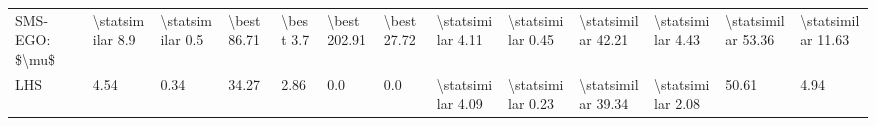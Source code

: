 \begin{tabular}{lllllllllllll}
SMS-EGO: \$\textbackslash mu\$ &   \textbackslash statsimilar 8.9 &   \textbackslash statsimilar 0.5 &         \textbackslash best 86.71 &           \textbackslash best 3.7 &         \textbackslash best 202.91 &         \textbackslash best 27.72 &  \textbackslash statsimilar 4.11 &  \textbackslash statsimilar 0.45 &  \textbackslash statsimilar 42.21 &  \textbackslash statsimilar 4.43 &  \textbackslash statsimilar 53.36 &  \textbackslash statsimilar 11.63 \\
LHS            &               4.54 &               0.34 &               34.27 &                2.86 &                  0.0 &                 0.0 &  \textbackslash statsimilar 4.09 &  \textbackslash statsimilar 0.23 &  \textbackslash statsimilar 39.34 &  \textbackslash statsimilar 2.08 &               50.61 &                4.94 \\
\bottomrule
\end{tabular}

